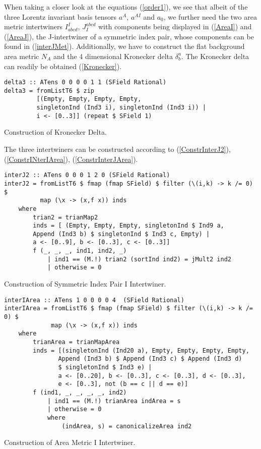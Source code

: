 When taking a closer look at the equations (\ref{order1}), we see that albeit of the three Lorentz invariant basis tensors $a^{A}$, $a^{AI}$ and $a_0$, we further need the two area metric intertwiners $I^I_{abcd}$, $J_I^{abcd}$ with components being displayed in (\ref{AreaI}) and (\ref{AreaJ}), the J-intertwiner of a symmetric index pair, whose components can be found in (\ref{interJMet}). Additionally, we have to construct the flat background area metric $N_A$ and the 4 dimensional Kronecker delta $\delta^a_b$. 
The Kronecker delta can readily be obtained (\ref{Kronecker}).
\begin{listing}[hbt!]
\begin{verbatim}
delta3 :: ATens 0 0 0 0 1 1 (SField Rational)
delta3 = fromListT6 $ zip
         [(Empty, Empty, Empty, Empty,
         singletonInd (Ind3 i), singletonInd (Ind3 i)) | 
         i <- [0..3]] (repeat $ SField 1)
\end{verbatim} 
\caption{Construction of Kronecker Delta.}\label{Kronecker}
\end{listing}
The three intertwiners can be constructed according to (\ref{ConstrInterJ2}), (\ref{ConstrINterIArea}), (\ref{ConstrInterJArea}).
\begin{listing}[hbt!]
\begin{verbatim}
interJ2 :: ATens 0 0 0 1 2 0 (SField Rational)
interJ2 = fromListT6 $ fmap (fmap SField) $ filter (\(i,k) -> k /= 0) $
          map (\x -> (x,f x)) inds
    where
        trian2 = trianMap2
        inds = [ (Empty, Empty, Empty, singletonInd $ Ind9 a,
        Append (Ind3 b) $ singletonInd $ Ind3 c, Empty) |
        a <- [0..9], b <- [0..3], c <- [0..3]]
        f (_, _, _, ind1, ind2, _)
            | ind1 == (M.!) trian2 (sortInd ind2) = jMult2 ind2
            | otherwise = 0
\end{verbatim} 
\caption{Construction of Symmetric Index Pair I Intertwiner.}\label{ConstrInterJ2}
\end{listing}
\begin{listing}[hbt!]
\begin{verbatim}
interIArea :: ATens 1 0 0 0 0 4  (SField Rational)
interIArea = fromListT6 $ fmap (fmap SField) $ filter (\(i,k) -> k /= 0) $
             map (\x -> (x,f x)) inds
    where
        trianArea = trianMapArea
        inds = [(singletonInd (Ind20 a), Empty, Empty, Empty, Empty,
               Append (Ind3 b) $ Append (Ind3 c) $ Append (Ind3 d) 
               $ singletonInd $ Ind3 e) |
               a <- [0..20], b <- [0..3], c <- [0..3], d <- [0..3],
               e <- [0..3], not (b == c || d == e)]
        f (ind1, _, _, _, _, ind2)
            | ind1 == (M.!) trianArea indArea = s
            | otherwise = 0
            where
                (indArea, s) = canonicalizeArea ind2
\end{verbatim} 
\caption{Construction of Area Metric I Intertwiner. }\label{ConstrINterIArea}
\end{listing}

